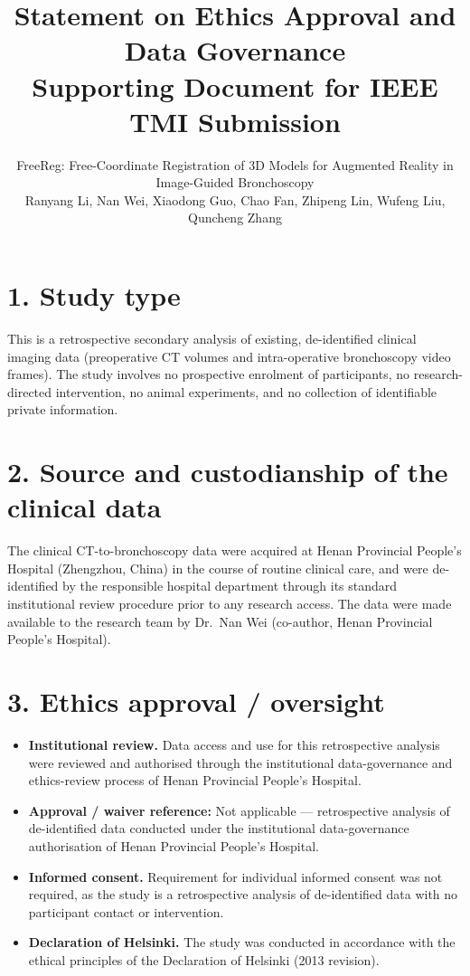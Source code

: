 \documentclass[11pt]{article}
\title{\textbf{Statement on Ethics Approval and Data Governance}\\[0.3em]
\large Supporting Document for IEEE TMI Submission}
\author{FreeReg: Free-Coordinate Registration of 3D Models for Augmented Reality in Image-Guided Bronchoscopy\\
Ranyang Li, Nan Wei, Xiaodong Guo, Chao Fan, Zhipeng Lin, Wufeng Liu, Quncheng Zhang}
\date{}
\begin{document}
\maketitle

\section*{1. Study type}
This is a retrospective secondary analysis of existing, de-identified clinical
imaging data (preoperative CT volumes and intra-operative bronchoscopy video
frames). The study involves no prospective enrolment of participants, no
research-directed intervention, no animal experiments, and no collection of
identifiable private information.

\section*{2. Source and custodianship of the clinical data}
The clinical CT-to-bronchoscopy data were acquired at Henan Provincial
People's Hospital (Zhengzhou, China) in the course of routine clinical care,
and were de-identified by the responsible hospital department through its
standard institutional review procedure prior to any research access. The data
were made available to the research team by Dr.~Nan Wei (co-author, Henan
Provincial People's Hospital).

\section*{3. Ethics approval / oversight}
\begin{itemize}
\item \textbf{Institutional review.} Data access and use for this retrospective
  analysis were reviewed and authorised through the institutional
  data-governance and ethics-review process of Henan Provincial People's
  Hospital.
  \item \textbf{Approval / waiver reference:} Not applicable --- retrospective
  analysis of de-identified data conducted under the institutional
  data-governance authorisation of Henan Provincial People's Hospital.
\item \textbf{Informed consent.} Requirement for individual informed consent was
  not required, as the study is a retrospective analysis of de-identified data
  with no participant contact or intervention.
\item \textbf{Declaration of Helsinki.} The study was conducted in accordance
  with the ethical principles of the Declaration of Helsinki (2013 revision).
\end{itemize}
\end{document}
